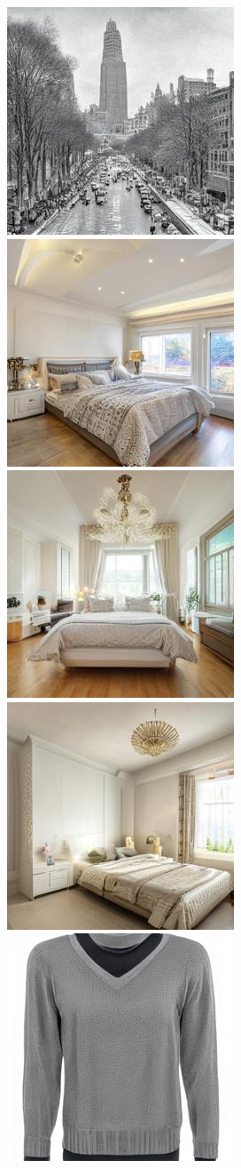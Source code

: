 \begin{figure}[h!]
\begin{subfigure}[t]{0.32\linewidth}
	\includegraphics[width=0.320\linewidth]{figs/samples_appendix_3/adjmat_cfg_2_ode_prompt_14_image_3.jpg}\\ 
	\includegraphics[width=0.320\linewidth]{figs/samples_appendix_3/adjmat_cfg_2_ode_prompt_19_image_1.jpg}\;%
	\includegraphics[width=0.320\linewidth]{figs/samples_appendix_3/adjmat_cfg_2_ode_prompt_19_image_2.jpg}\;%
	\includegraphics[width=0.320\linewidth]{figs/samples_appendix_3/adjmat_cfg_2_ode_prompt_19_image_3.jpg}\\ 
	\includegraphics[width=0.320\linewidth]{figs/samples_appendix_3/adjmat_cfg_2_ode_prompt_28_image_1.jpg}\;%

\end{subfigure}
\end{figure}
